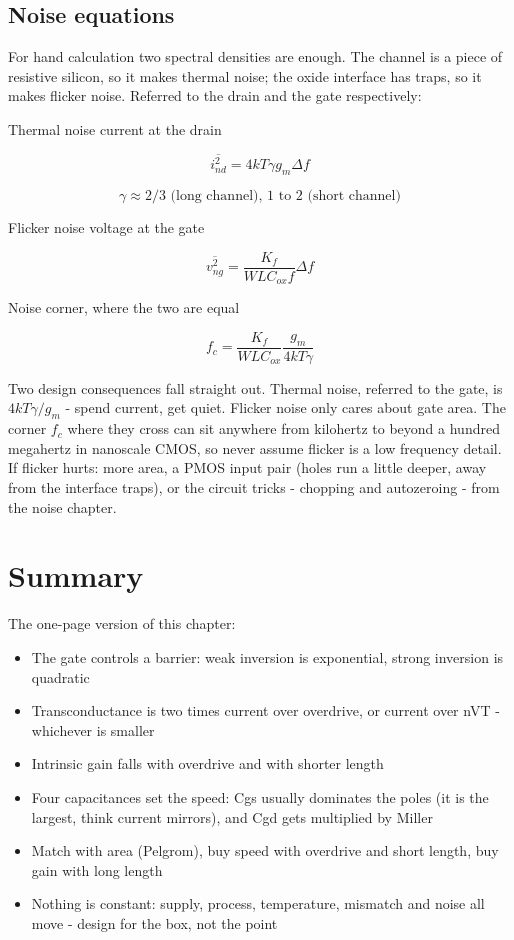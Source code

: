 \subsection{Noise equations}\label{noise-equations}

For hand calculation two spectral densities are enough. The channel is a
piece of resistive silicon, so it makes thermal noise; the oxide
interface has traps, so it makes flicker noise. Referred to the drain
and the gate respectively:

Thermal noise current at the drain

\[ \overline{i_{nd}^2} = 4 k T \gamma g_m \Delta f \]

\[ \gamma \approx 2/3 \text{ (long channel), } 1 \text{ to } 2 \text{ (short channel)} \]

Flicker noise voltage at the gate

\[ \overline{v_{ng}^2} = \frac{K_f}{W L C_{ox} f} \Delta f \]

Noise corner, where the two are equal

\[ f_c = \frac{K_f}{W L C_{ox}} \frac{g_m}{4 k T \gamma} \]

Two design consequences fall straight out. Thermal noise, referred to
the gate, is \(4kT\gamma/g_m\) - spend current, get quiet. Flicker noise
only cares about gate area. The corner \(f_c\) where they cross can sit
anywhere from kilohertz to beyond a hundred megahertz in nanoscale CMOS,
so never assume flicker is a low frequency detail. If flicker hurts:
more area, a PMOS input pair (holes run a little deeper, away from the
interface traps), or the circuit tricks - chopping and autozeroing -
from the noise chapter.

\section{Summary}\label{summary}

The one-page version of this chapter:

\begin{itemize}
\tightlist
\item
  The gate controls a barrier: weak inversion is exponential, strong
  inversion is quadratic
\item
  Transconductance is two times current over overdrive, or current over
  nVT - whichever is smaller
\item
  Intrinsic gain falls with overdrive and with shorter length
\item
  Four capacitances set the speed: Cgs usually dominates the poles (it
  is the largest, think current mirrors), and Cgd gets multiplied by
  Miller
\item
  Match with area (Pelgrom), buy speed with overdrive and short length,
  buy gain with long length
\item
  Nothing is constant: supply, process, temperature, mismatch and noise
  all move - design for the box, not the point
\end{itemize}

